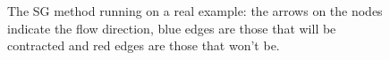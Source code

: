\documentclass[preprint,a4paper]{elsarticle}
\newenvironment{stusubfig}[1]
{
	\begin{figure}[#1]
	\begin{center}
}
{
	\end{center}
	\end{figure}
}
\begin{document}
\begin{stusubfig}{!t}
\caption[The SG method running on a real example]{The SG method running on a real example: the arrows on the nodes indicate the flow direction, blue edges are those that will be contracted and red edges are those that won't be.}
\label{fig:segmentation-waterfall-smg-example}
\end{stusubfig}
\end{document}
